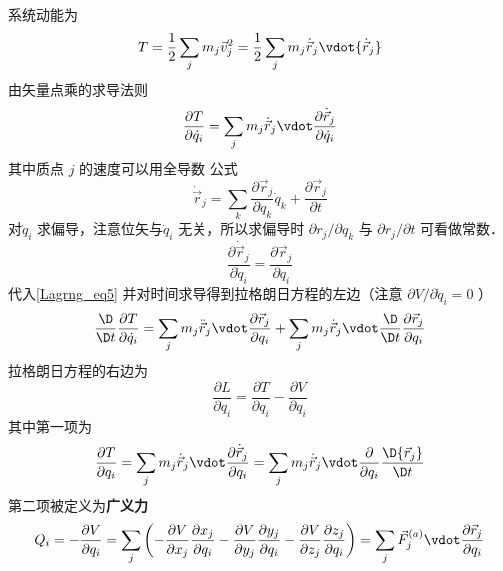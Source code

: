 系统动能为
\begin{equation}
T = \frac{1}{2}\sum\limits_j {{m_j}{{\vec v_j}^2}}  = \frac{1}{2}\sum\limits_j {m_j}{{\dot{\vec r}}_j} \vdot {{\dot {\vec r}}_j}
\end{equation}
由矢量点乘的求导法则
\begin{equation}\label{Lagrng_eq5}
\frac{{\partial T}}{{\partial {{\dot q}_i}}} = \sum\limits_j {{m_j}{{\dot {\vec r}}_j} \vdot \frac{{\partial {{\dot {\vec r}}_j}}}{{\partial {{\dot q}_i}}}}
\end{equation}
其中质点 $j$ 的速度可以用全导数 公式
\begin{equation}
{{\dot {\vec r}}_j} = \sum\limits_k {\frac{{\partial {{\vec r}_j}}}{{\partial {q_k}}}{{\dot q}_k}}  + \frac{{\partial {{\vec r}_j}}}{{\partial t}}
\end{equation}
对$\dot q_i$ 求偏导，注意位矢与$\dot q_i$ 无关，所以求偏导时 $\partial {r_j}/\partial {q_k}$ 与 $\partial {r_j}/\partial t$ 可看做常数．
\begin{equation}
\frac{{\partial {{\dot {\vec r}}_j}}}{{\partial {{\dot q}_i}}} = \frac{{\partial {{\vec r}_j}}}{{\partial {q_i}}}
\end{equation}
代入\autoref{Lagrng_eq5} 并对时间求导得到拉格朗日方程的左边（注意 $\partial V/\partial\dot q_i = 0$ ）
\begin{equation}\label{Lagrng_eq8}
\frac{\D}{{\D t}}\frac{{\partial T}}{{\partial {{\dot q}_i}}} = \sum\limits_j {{m_j}{{\ddot {\vec r}}_j} \vdot \frac{{\partial {{\vec r}_j}}}{{\partial {q_i}}}}  + \sum\limits_j {{m_j}{{\dot {\vec r}}_j} \vdot \frac{\D}{{\D t}}\frac{{\partial {{\vec r}_j}}}{{\partial {q_i}}}} 
\end{equation}
拉格朗日方程的右边为
\begin{equation}\label{Lagrng_eq9}
\frac{{\partial L}}{{\partial {q_i}}} = \frac{{\partial T}}{{\partial {q_i}}} - \frac{{\partial V}}{{\partial {q_i}}}
\end{equation}
其中第一项为
\begin{equation}\label{Lagrng_eq28}
\frac{{\partial T}}{{\partial {q_i}}} = \sum\limits_j {{m_j}{{\dot {\vec r}}_j} \vdot \frac{{\partial {{\dot {\vec r}}_j}}}{{\partial {q_i}}}} = \sum\limits_j {{m_j}{{\dot {\vec r}}_j} \vdot \frac{\partial }{{\partial {q_i}}}\frac{{\D{{\vec r}_j}}}{{\D t}}}
\end{equation}
第二项被定义为\textbf{广义力}
\begin{equation}\label{Lagrng_eq29}
Q_i = - \frac{{\partial V}}{{\partial {q_i}}} = \sum\limits_j {\left( { - \frac{{\partial V}}{{\partial {x_j}}}\frac{{\partial {x_j}}}{{\partial {q_i}}} - \frac{{\partial V}}{{\partial {y_j}}}\frac{{\partial {y_j}}}{{\partial {q_i}}} - \frac{{\partial V}}{{\partial {z_j}}}\frac{{\partial {z_j}}}{{\partial {q_i}}}} \right)}  = \sum\limits_j {{{\vec F}_j^{(a)}} \vdot \frac{{\partial {{\vec r}_j}}}{{\partial {q_i}}}}  
\end{equation}
